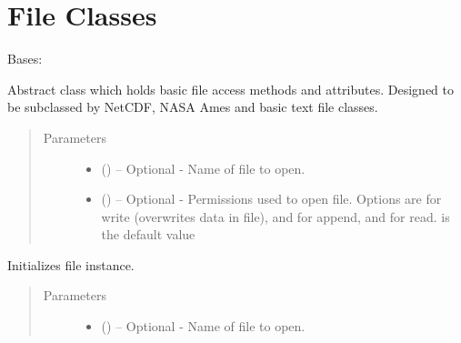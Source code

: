 \documentclass[a4paper,10pt,openany,english]{sphinxmanual}
\begin{document}
\begin{fulllineitems}
\begin{fulllineitems}
\begin{quote}
\begin{description}
\end{description}\end{quote}

\end{fulllineitems}


\end{fulllineitems}



\section{File Classes}
\label{egadsapi:module-egads.input.input_core}\label{egadsapi:file-classes}

\begin{fulllineitems}
\label{egadsapi:egads.input.input_core.FileCore}
Bases: 

Abstract class which holds basic file access methods and attributes.
Designed to be subclassed by NetCDF, NASA Ames and basic text file
classes.

\begin{quote}\begin{description}
\item[{Parameters}] \leavevmode\begin{itemize}
\item {} 
 () -- Optional -
Name of file to open.

\item {} 
 () -- Optional -
Permissions used to open file. Options are  for write (overwrites data in file),
 and  for append, and  for read.  is the default value

\end{itemize}

\end{description}\end{quote}

Initializes file instance.
\begin{quote}\begin{description}
\item[{Parameters}] \leavevmode\begin{itemize}
\item {} 
 () -- Optional -
Name of file to open.


\end{itemize}
\end{description}
\end{quote}
\end{fulllineitems}
\end{document}
